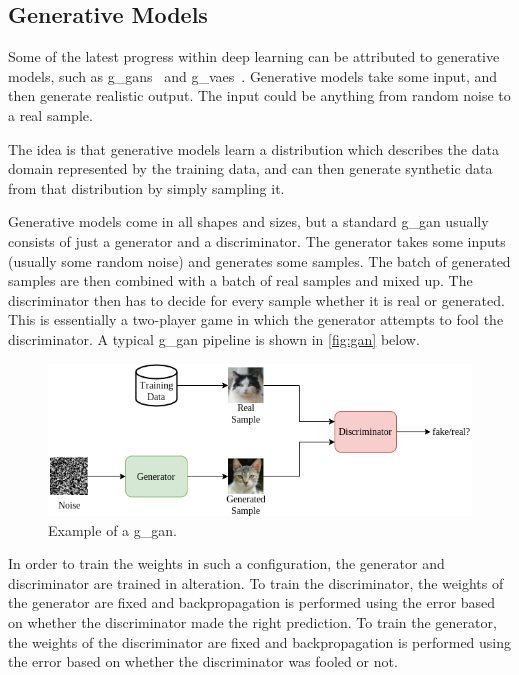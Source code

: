 \subsection{Generative Models}
Some of the latest progress within deep learning can be attributed to generative models, such as \glspl*{g_gan}~\cite{gan} and \glspl*{g_vae}~\cite{vae}. Generative models take some input, and then generate realistic output. The input could be anything from random noise to a real sample.
\par
The idea is that generative models learn a distribution which describes the data domain represented by the training data, and can then generate synthetic data from that distribution by simply sampling it.
\par
Generative models come in all shapes and sizes, but a standard \gls*{g_gan} usually consists of just a generator and a discriminator. The generator takes some inputs (usually some random noise) and generates some samples. The batch of generated samples are then combined with a batch of real samples and mixed up. The discriminator then has to decide for every sample whether it is real or generated. This is essentially a two-player game in which the generator attempts to fool the discriminator. A typical \gls*{g_gan} pipeline is shown in \autoref{fig:gan} below.
\begin{figure}[H]
    \centering
    \includegraphics[width=\linewidth]{resources/related_works/gan.png}
    \caption[Gan Example]{Example of a \gls*{g_gan}.}
    \label{fig:gan}
\end{figure}
In order to train the weights in such a configuration, the generator and discriminator are trained in alteration. To train the discriminator, the weights of the generator are fixed and backpropagation is performed using the error based on whether the discriminator made the right prediction. To train the generator, the weights of the discriminator are fixed and backpropagation is performed using the error based on whether the discriminator was fooled or not.
\par
